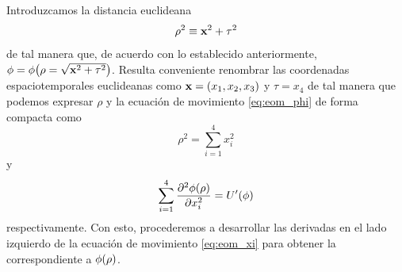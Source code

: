 Introduzcamos la distancia euclideana
\begin{equation}
	\rho^2 \equiv \vb{x}^2 + \tau^2
\end{equation}
de tal manera que, de acuerdo con lo establecido anteriormente,  $\phi = \phi\qty(\rho = \sqrt{\vb{x}^2 + \tau^2})$. 
%
Resulta conveniente renombrar las coordenadas espaciotemporales euclideanas como $\vb{x} = \qty(x_1, x_2, x_3)$ y $\tau = x_4$ de tal manera que podemos expresar $\rho$ y la ecuación de movimiento \eqref{eq:eom_phi} de forma compacta como
\begin{equation} \label{eq:rho_xi}
	\rho^2 = \sum_{i = 1}^{4} x_i^2
\end{equation}
y 
\begin{equation} \label{eq:eom_xi}
\sum_{i = 1}^{4} \pdv[2]{\phi\qty(\rho)}{x_i} = U'\qty(\phi)
\end{equation}
respectivamente. 
Con esto, procederemos a desarrollar las derivadas 
en el lado izquierdo de la ecuación de movimiento \eqref{eq:eom_xi} para obtener  
la correspondiente a $\phi\qty(\rho)$. 

